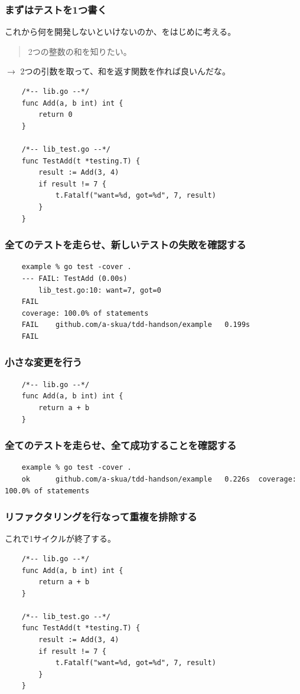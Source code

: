 \documentclass[aspectratio=169]{beamer}
\begin{document}
\begin{frame}[fragile]\frametitle{まずはテストを1つ書く}
  これから何を開発しないといけないのか、をはじめに考える。

  \begin{quote}
    \color{blue}
    2つの整数の和を知りたい。
  \end{quote}
  $\rightarrow$ 2つの引数を取って、和を返す関数を作れば良いんだな。

  \scriptsize
  \begin{verbatim}
    /*-- lib.go --*/
    func Add(a, b int) int {
        return 0
    }

    /*-- lib_test.go --*/
    func TestAdd(t *testing.T) {
        result := Add(3, 4)
        if result != 7 {
            t.Fatalf("want=%d, got=%d", 7, result)
        }
    }
  \end{verbatim}
\end{frame}

\begin{frame}[fragile]\frametitle{全てのテストを走らせ、新しいテストの失敗を確認する}
  \scriptsize
  \begin{verbatim}
    example % go test -cover .
    --- FAIL: TestAdd (0.00s)
        lib_test.go:10: want=7, got=0
    FAIL
    coverage: 100.0% of statements
    FAIL	github.com/a-skua/tdd-handson/example	0.199s
    FAIL
  \end{verbatim}
\end{frame}

\begin{frame}[fragile]\frametitle{小さな変更を行う}
  \scriptsize
  \begin{verbatim}
    /*-- lib.go --*/
    func Add(a, b int) int {
        return a + b
    }
  \end{verbatim}
\end{frame}

\begin{frame}[fragile]\frametitle{全てのテストを走らせ、全て成功することを確認する}
  \scriptsize
  \begin{verbatim}
    example % go test -cover .
    ok  	github.com/a-skua/tdd-handson/example	0.226s	coverage: 100.0% of statements
  \end{verbatim}
\end{frame}

\begin{frame}[fragile]\frametitle{リファクタリングを行なって重複を排除する}
  これで1サイクルが終了する。
  \scriptsize
  \begin{verbatim}
    /*-- lib.go --*/
    func Add(a, b int) int {
        return a + b
    }

    /*-- lib_test.go --*/
    func TestAdd(t *testing.T) {
        result := Add(3, 4)
        if result != 7 {
            t.Fatalf("want=%d, got=%d", 7, result)
        }
    }
  \end{verbatim}
\end{frame}
\end{document}

